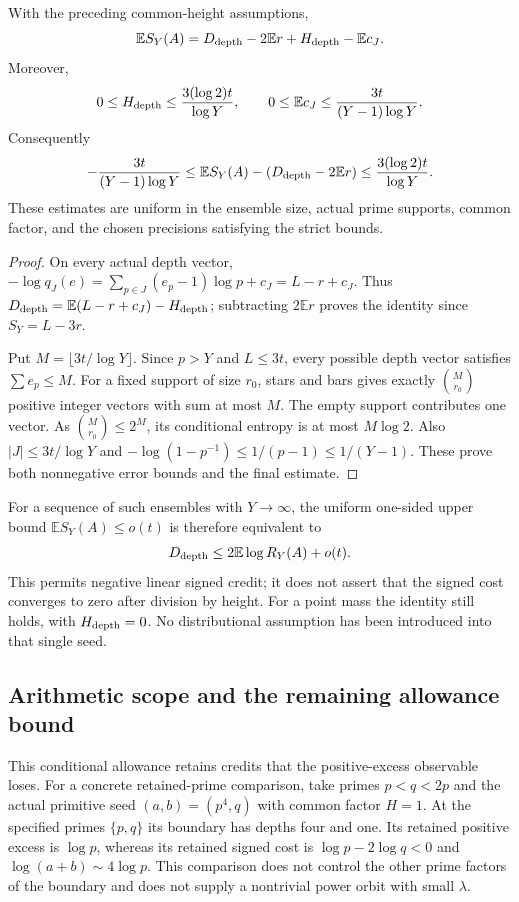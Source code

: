 \begin{theorem}\label{se-height}
With the preceding common-height assumptions,
\[
 \mathbb E S_Y(A)=D_{\rm depth}-2\mathbb E r
                     +H_{\rm depth}-\mathbb E c_J.
\]
Moreover,
\[
 0\le H_{\rm depth}\le\frac{3(\log2)t}{\log Y},
 \qquad 0\le\mathbb E c_J\le\frac{3t}{(Y-1)\log Y}.
\]
Consequently
\[
 -\frac{3t}{(Y-1)\log Y}
 \le \mathbb E S_Y(A)-(D_{\rm depth}-2\mathbb E r)
 \le \frac{3(\log2)t}{\log Y}.
\]
These estimates are uniform in the ensemble size, actual prime supports,
common factor, and the chosen precisions satisfying the strict bounds.
\end{theorem}
\begin{proof}
On every actual depth vector,
$-\log q_J(e)=\sum_{p\in J}(e_p-1)\log p+c_J=L-r+c_J$.
Thus $D_{\rm depth}=\mathbb E(L-r+c_J)-H_{\rm depth}$;
subtracting $2\mathbb E r$ proves the identity since $S_Y=L-3r$.

Put $M=\lfloor3t/\log Y\rfloor$. Since $p>Y$ and $L\le3t$,
every possible depth vector satisfies $\sum e_p\le M$.
For a fixed support of size $r_0$, stars and bars gives exactly
$\binom M{r_0}$ positive integer vectors with sum at most $M$.
The empty support contributes one vector. As
$\binom M{r_0}\le2^M$, its conditional entropy is at most
$M\log2$. Also $|J|\le3t/\log Y$ and
$-\log(1-p^{-1})\le1/(p-1)\le1/(Y-1)$.
These prove both nonnegative error bounds and the final estimate.
\end{proof}

For a sequence of such ensembles with $Y\to\infty$, the uniform
one-sided upper bound $\mathbb E S_Y(A)\le o(t)$ is therefore
equivalent to
\[
 D_{\rm depth}\le2\mathbb E\log R_Y(A)+o(t).
\]
This permits negative linear signed credit; it does not assert that
the signed cost converges to zero after division by height.
For a point mass the identity still holds, with $H_{\rm depth}=0$.
No distributional assumption has been introduced into that single seed.

\subsection{Arithmetic scope and the remaining allowance bound}
This conditional allowance retains credits that the positive-excess
observable loses. For a concrete retained-prime comparison, take primes
$p<q<2p$ and the actual primitive seed $(a,b)=(p^4,q)$ with common
factor $H=1$. At the specified primes $\{p,q\}$ its boundary has
depths four and one. Its retained positive excess is $\log p$, whereas
its retained signed cost is $\log p-2\log q<0$ and
$\log(a+b)\sim4\log p$. This comparison does not control the other
prime factors of the boundary and does not supply a nontrivial power
orbit with small $\lambda$.

